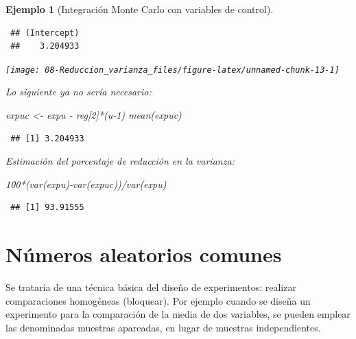 \documentclass[
]{book}
\newenvironment{Shaded}{\begin{snugshade}}{\end{snugshade}}
\newcommand{\DecValTok}[1]{\textcolor[rgb]{0.00,0.00,0.81}{#1}}
\newcommand{\FunctionTok}[1]{\textcolor[rgb]{0.00,0.00,0.00}{#1}}
\newcommand{\NormalTok}[1]{#1}
\newcommand{\OtherTok}[1]{\textcolor[rgb]{0.56,0.35,0.01}{#1}}
\newcommand{\SpecialCharTok}[1]{\textcolor[rgb]{0.00,0.00,0.00}{#1}}
\theoremstyle{break}
\newtheorem{example}{Ejemplo}[chapter]
\theoremstyle{nonumberplain}
\begin{document}
\begin{example}[Integración Monte Carlo con variables de control]
\begin{verbatim}
 ## (Intercept) 
 ##    3.204933
\end{verbatim}

\begin{center}\texttt{[image: 08-Reduccion\_varianza\_files/figure-latex/unnamed-chunk-13-1]} \end{center}

Lo siguiente ya no sería necesario:

\begin{Shaded}
\begin{Highlighting}[]
\NormalTok{expuc }\OtherTok{\textless{}{-}}\NormalTok{ expu }\SpecialCharTok{{-}}\NormalTok{ reg[}\DecValTok{2}\NormalTok{]}\SpecialCharTok{*}\NormalTok{(u}\DecValTok{{-}1}\NormalTok{)}
\FunctionTok{mean}\NormalTok{(expuc)  }
\end{Highlighting}
\end{Shaded}

\begin{verbatim}
 ## [1] 3.204933
\end{verbatim}

Estimación del porcentaje de reducción en la varianza:

\begin{Shaded}
\begin{Highlighting}[]
\DecValTok{100}\SpecialCharTok{*}\NormalTok{(}\FunctionTok{var}\NormalTok{(expu)}\SpecialCharTok{{-}}\FunctionTok{var}\NormalTok{(expuc))}\SpecialCharTok{/}\FunctionTok{var}\NormalTok{(expu)}
\end{Highlighting}
\end{Shaded}

\begin{verbatim}
 ## [1] 93.91555
\end{verbatim}

\end{example}

\hypertarget{nuxfameros-aleatorios-comunes}{%
\section{Números aleatorios comunes}\label{nuxfameros-aleatorios-comunes}}

Se trataría de una técnica básica del diseño de experimentos:
realizar comparaciones homogéneas (bloquear).
Por ejemplo cuando se diseña un experimento para la comparación
de la media de dos variables, se pueden emplear las denominadas
muestras apareadas, en lugar de muestras independientes.
\end{document}
